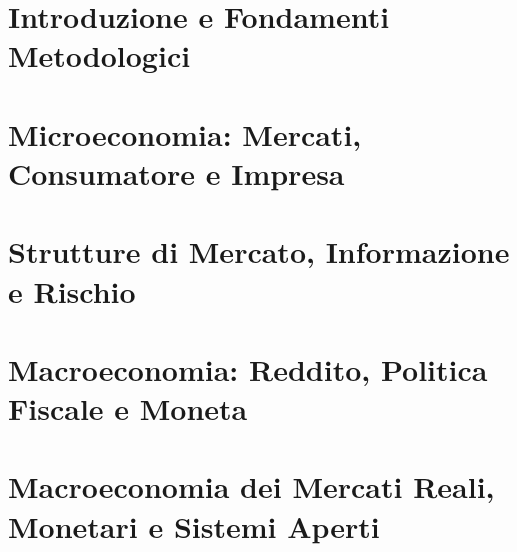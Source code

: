 \documentclass[11pt,a4paper,twoside,openright]{book}
\begin{document}
\cleardoublepage

\mainmatter

\part{Introduzione e Fondamenti Metodologici}



\part{Microeconomia: Mercati, Consumatore e Impresa}






\part{Strutture di Mercato, Informazione e Rischio}



\part{Macroeconomia: Reddito, Politica Fiscale e Moneta}





\part{Macroeconomia dei Mercati Reali, Monetari e Sistemi Aperti}






\backmatter
\end{document}
